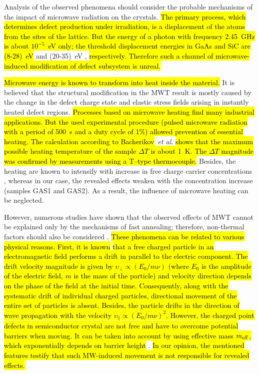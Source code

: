 \documentclass[10pt]{iopart}
\begin{document}
Analysis of the observed phenomena should consider
the probable mechanisms of the impact of microwave radiation on the crystals.
\hl{The primary process, which determines defect production under irradiation,
is a displacement of the atoms from the sites of the lattice.
But the energy of a photon with frequency 2.45~GHz is about $10^{-5}$~eV only;
the threshold displacement energies in GaAs and SiC are (8-28)~eV }\cite{Ed:GaAs} and (20-35)~eV \cite{Ed:SiC},\hl{ respectively.
Therefore such a channel of microwave-induced modification of defect subsystem is unreal.}

\hl{Microwave energy is known to transform into heat inside the material.}
It is believed that the structural modification in the MWT result  is mostly caused by the change
in the defect charge state and elastic stress fields arising in instantly heated defect regions.
\hl{Processes based on microwave heating find many industrial applications.
But the used experimental procedure
(pulsed microwave radiation with a period of 500~s and a duty cycle of 1\%)
allowed prevention of essential heating.
The calculation according to Bacherikov}~\emph{et al}. \cite{Bacherikov2008En} 
\hl{shows that
the maximum possible heating temperature of the sample $\Delta T$ is about 1~K.
The $\Delta T$ magnitude was confirmed by measurements using a T--type thermocouple.}
Besides, the heating are known to intensify with increase in free charge carrier concentrations \cite{MW:Rev},
whereas in our case, the revealed effects weaken with the concentration increase (samples GAS1 and GAS2).
As a result, the influence of microwave heating can be neglected.

However, numerous studies have shown that the observed effects of MWT cannot be explained only by the mechanisms of fast  annealing;
therefore, non-thermal factors should also be considered \cite{MW:Si2018,MWT:Rew2001}.
\hl{These phenomena can be related to various physical reasons.
First, it is known} \cite{MW:Force,Milenin:SPQEO2020} 
\hl{that a free charged particle in an electromagnetic field
performs a drift in parallel to the electric component.
The drift velocity magnitude is given by $\upsilon_{\bot}\propto (E_0/m \nu)$
(where
$E_0$ is the amplitude of the electric field,
$m$ is the mass of the particle)
and velocity direction depends on the phase
of the field at the initial time.
Consequently, along with the systematic drift of individual charged
particles, directional movement of the entire
set of particles is absent.
Besides, the particle drifts in the direction of
wave propagation with the velocity $\upsilon_\|\propto(E_0/m \nu)^2$.
However, the charged point defects in
semiconductor crystal are not free and
have to overcome potential barriers when moving.
It can be taken into account by using effective
mass $m_{\rm eff}$, which exponentially depends on barrier height} \cite{Milenin:SPQEO2020}.
\hl{In our opinion, the mentioned features testify that
such MW-induced movement is not responsible for revealed effects.}
\end{document}
